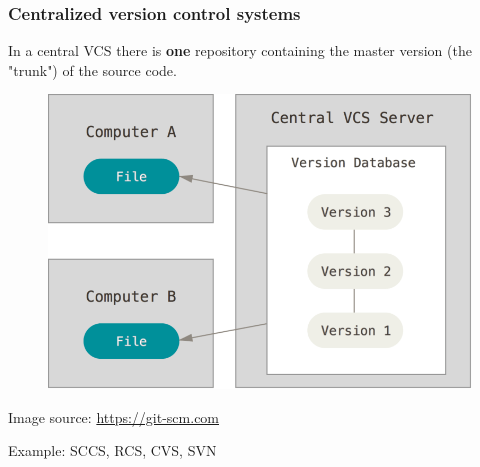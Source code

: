 \documentclass[11pt]{beamer}
\begin{document}

\begin{frame}[fragile]
\frametitle{Centralized version control systems}

\centering
\footnotesize{In a central VCS there is \textbf{one} repository containing the master version (the "trunk") of the source code.}
\begin{figure}[htp]
 \includegraphics[scale=0.25]{centralized.png}
\end{figure}
 \tiny{Image source: \url{https://git-scm.com}}

\centering
\footnotesize{Example: SCCS, RCS, CVS, SVN}\\




\end{frame}


\end{document}
